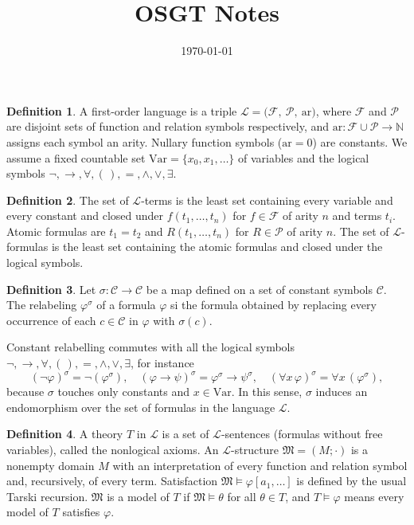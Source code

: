 \documentclass[11pt]{article}
\title{\textbf{OSGT Notes}}
\date{\today}
\theoremstyle{definition}
\newtheorem{definition}{Definition}[section]
\theoremstyle{plain}
\theoremstyle{remark}
\begin{document}
\maketitle

\begin{definition}
A first-order language is a triple $\mathcal{L} = \bigl(\mathcal{F},\ \mathcal{P},\ \mathrm{ar}\bigr)$,
where $\mathcal{F}$ and $\mathcal{P}$ are disjoint sets of function and relation symbols
respectively, and $\mathrm{ar}\colon \mathcal{F}\cup\mathcal{P}\to\mathbb{N}$ assigns each
symbol an arity. Nullary function symbols ($\mathrm{ar}=0$) are constants. We assume a fixed
countable set $\mathrm{Var}=\{x_0,x_1,\dots\}$ of variables and the logical symbols
$\neg,\to,\forall,(\,),=,\wedge,\vee,\exists$.
\end{definition}

\begin{definition}
The set of $\mathcal{L}$-terms is the least set containing every variable and every constant
and closed under $f(t_1,\dots,t_n)$ for $f\in\mathcal{F}$ of arity $n$ and terms $t_i$.
Atomic formulas are $t_1=t_2$ and $R(t_1,\dots,t_n)$ for $R\in\mathcal{P}$ of arity $n$.
The set of $\mathcal{L}$-formulas is the least set containing the atomic formulas and closed
under the logical symbols.
\end{definition}



\begin{definition}\label{def:endomorph}
    Let $\sigma:\mathcal{C} \to \mathcal{C}$ be a map defined on a set of constant symbols $\mathcal{C}$. The relabeling $\varphi^\sigma$ of a formula $\varphi$ si the formula obtained by replacing every occurrence of each $c \in \mathcal{C}$ in $\varphi$ with $\sigma(c)$.
\end{definition}
    
Constant relabelling commutes with all the logical symbols $\lnot,\to,\forall,(\,),{=},\land,\lor,\exists$, for instance 
\begin{equation}\label{eq:commute}
(\lnot\varphi)^{\sigma}=\lnot(\varphi^{\sigma}),\quad
(\varphi\to\psi)^{\sigma}=\varphi^{\sigma}\to\psi^{\sigma},\quad
(\forall x\,\varphi)^{\sigma}=\forall x\,(\varphi^{\sigma}),
\end{equation}
because $\sigma$ touches only constants and $x\in\mathrm{Var}$. In this sense, $\sigma$ induces an endomorphism over the set of formulas in the language $\mathcal{L}$.


\begin{definition}
A theory $T$ in $\mathcal{L}$ is a set of $\mathcal{L}$-sentences (formulas without free
variables), called the nonlogical axioms. An $\mathcal{L}$-structure $\mathfrak{M}=(M;\cdot)$ is a
nonempty domain $M$ with an interpretation of every function and relation symbol and,
recursively, of every term. Satisfaction $\mathfrak{M}\models\varphi[a_1,\dots]$ is defined
by the usual Tarski recursion. $\mathfrak{M}$ is a model of $T$ if $\mathfrak{M}\models\theta$
for all $\theta\in T$, and $T\models\varphi$ means every model of $T$ satisfies $\varphi$.
\end{definition}
\end{document}
